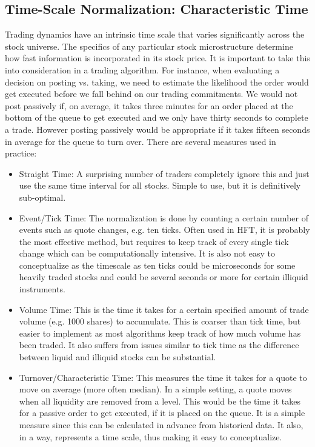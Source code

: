 \subsection{Time-Scale Normalization: Characteristic Time\label{sec:time_norm}}

Trading dynamics have an intrinsic time scale that varies significantly across the stock universe. The specifics of any particular stock microstructure determine how fast information is incorporated in its stock price. It is important to take this into consideration in a trading algorithm. For instance, when evaluating a decision on posting vs. taking, we need to estimate the likelihood the order would get executed before we fall behind on our trading commitments. We would not post passively if, on average, it takes three minutes for an order placed at the bottom of the queue to get executed and we only have thirty seconds to complete a trade. However posting passively would be appropriate if it takes fifteen seconds in average for the queue to turn over. There are several measures used in practice:
        \begin{itemize}
        \item Straight Time: A surprising number of traders completely ignore this and just use the same time interval for all stocks. Simple to use, but it is definitively sub-optimal.
        \item Event/Tick Time: The normalization is done by counting a certain number of events such as quote changes, e.g. ten ticks. Often used in HFT, it is probably the most effective method, but requires to keep track of every single tick change which can be computationally intensive. It is also not easy to conceptualize as the timescale as ten ticks could be microseconds for some heavily traded stocks and could be several seconds or more for certain illiquid instruments.
        \item Volume Time: This is the time it takes for a certain specified amount of trade volume (e.g. 1000 shares) to accumulate. This is coarser than tick time, but easier to implement as most algorithms keep track of how much volume has been traded. It also suffers from issues similar to tick time as the difference between liquid and illiquid stocks can be substantial.
        \item Turnover/Characteristic Time: This measures the time it takes for a quote to move on average (more often median). In a simple setting, a quote moves when all liquidity are removed from a level. This would be the time it takes for a passive order to get executed, if it is placed on the queue. It is a simple measure since this can be calculated in advance from historical data. It also, in a way, represents a time scale, thus making it easy to conceptualize.
        \end{itemize}


